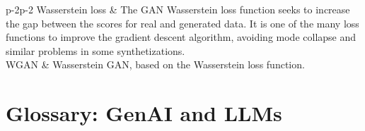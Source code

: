 \documentclass[oneside,10pt]{book}
\begin{document}
\begin{center}
\begin{longtblr}{p{-2\tabcolsep}p{-2\tabcolsep}}
\hline Wasserstein loss & The GAN \textcolor{index}{Wasserstein loss function} seeks to increase the gap between the scores for real and generated data. It is one of the many loss functions to improve the gradient descent algorithm, avoiding mode collapse and similar problems in some synthetizations.\\
\hline WGAN & Wasserstein GAN, based on the Wasserstein loss function.\\
\hline
\end{longtblr}
\end{center}


\chapter{Glossary: GenAI and LLMs}\label{aasdaaq32}
\end{document}
